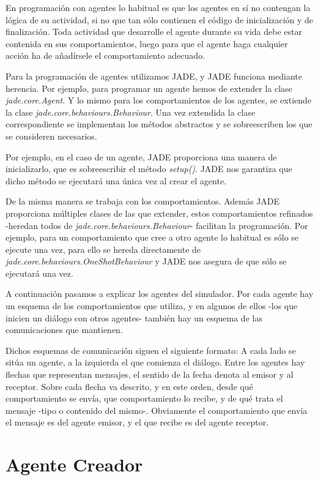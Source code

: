 En programación con agentes lo habitual es que los agentes en sí no contengan
la lógica de su actividad, si no que tan sólo contienen el código de
inicialización y de finalización. Toda actividad que desarrolle el agente
durante su vida debe estar contenida en sus comportamientos, luego para que el
agente haga cualquier acción ha de añadírsele el comportamiento adecuado.

Para la programación de agentes utilizamos JADE, y JADE funciona mediante
herencia. Por ejemplo, para programar un agente hemos de extender la clase {\em
jade.core.Agent}. Y lo mismo para los comportamientos de los agentes, se
extiende la clase {\em jade.core.behaviours.Behaviour}. Una vez extendida la
clase correspondiente se implementan los métodos abstractos y se sobreescriben
los que se consideren necesarios.

Por ejemplo, en el caso de un agente, JADE proporciona una manera de
inicializarlo, que es sobreescribir el método {\em setup()}. JADE nos garantiza
que dicho método se ejecutará una única vez al crear el agente.

De la misma manera se trabaja con los comportamientos. Además JADE proporciona
múltiples clases de las que extender, estos comportamientos refinados -heredan
todos de {\em jade.core.behaviours.Behaviour}- facilitan la programación. Por
ejemplo, para un comportamiento que cree a otro agente lo habitual es sólo se
ejecute una vez, para ello se hereda directamente de {\em
jade.core.behaviours.OneShotBehaviour} y JADE nos asegura de que sólo se
ejecutará una vez.

A continuación pasamos a explicar los agentes del simulador. Por cada agente
hay un esquema de los comportamientos que utiliza, y en algunos de ellos -los
que inicien un diálogo con otros agentes- también hay un esquema de las
comunicaciones que mantienen.

Dichos esquemas de comunicación siguen el siguiente formato: A cada lado se
sitúa un agente, a la izquierda el que comienza el diálogo. Entre los agentes
hay flechas que representan mensajes, el sentido de la fecha denota al emisor y
al receptor. Sobre cada flecha va descrito, y en este orden, desde qué
comportamiento se envía, que comportamiento lo recibe, y de qué trata el
mensaje -tipo o contenido del mismo-. Obviamente el comportamiento que envía el
mensaje es del agente emisor, y el que recibe es del agente receptor.

\section*{Agente Creador}

